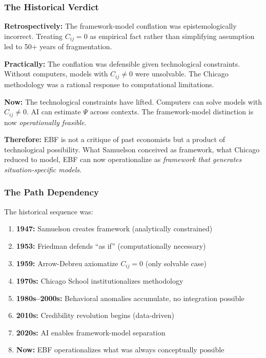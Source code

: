 \subsubsection{The Historical Verdict}

\begin{tcolorbox}[colback=gray!5!white, colframe=gray!75!black,
    title=\textbf{A Non-Moral Assessment}]

\textbf{Retrospectively:} The framework-model conflation was epistemologically
incorrect. Treating $C_{ij} = 0$ as empirical fact rather than simplifying
assumption led to 50+ years of fragmentation.

\textbf{Practically:} The conflation was defensible given technological
constraints. Without computers, models with $C_{ij} \neq 0$ were unsolvable.
The Chicago methodology was a rational response to computational limitations.

\textbf{Now:} The technological constraints have lifted. Computers can solve
models with $C_{ij} \neq 0$. AI can estimate $\Psi$ across contexts.
The framework-model distinction is now \textit{operationally feasible}.

\textbf{Therefore:} EBF is not a critique of past economists but a product
of technological possibility. What Samuelson conceived as framework,
what Chicago reduced to model, EBF can now operationalize as
\textit{framework that generates situation-specific models}.
\end{tcolorbox}

\subsubsection{The Path Dependency}

The historical sequence was:

\begin{enumerate}[nosep]
    \item \textbf{1947:} Samuelson creates framework (analytically constrained)
    \item \textbf{1953:} Friedman defends ``as if'' (computationally necessary)
    \item \textbf{1959:} Arrow-Debreu axiomatize $C_{ij} = 0$ (only solvable case)
    \item \textbf{1970s:} Chicago School institutionalizes methodology
    \item \textbf{1980s--2000s:} Behavioral anomalies accumulate, no integration possible
    \item \textbf{2010s:} Credibility revolution begins (data-driven)
    \item \textbf{2020s:} AI enables framework-model separation
    \item \textbf{Now:} EBF operationalizes what was always conceptually possible
\end{enumerate}

